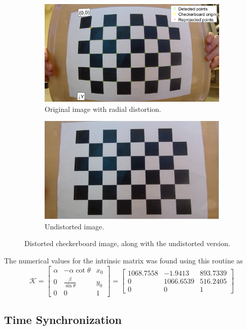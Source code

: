 \begin{figure}[H]
	\centering
	\begin{subfigure}{.5\textwidth}
		\centering
		\includegraphics[width=.8\linewidth]{fig/calibration_distorted.PNG}
		\caption{Original image with radial distortion.}
		\label{fig:sub_distort1}
	\end{subfigure}%
	\begin{subfigure}{.5\textwidth}
		\centering
		\includegraphics[width=.8\linewidth]{fig/calibration_undistorted.PNG}
		\caption{Undistorted image.}
		\label{fig:sub_distort2}
	\end{subfigure}
	\caption{Distorted checkerboard image, along with the undistorted version.}
	\label{fig:distortion}
\end{figure}
The numerical values for the intrinsic matrix was found using this routine as
\begin{equation}
\mathcal{K}=\begin{bmatrix}\alpha & -\alpha\cot{\theta} & x_0\\0 & \frac{\beta}{\sin{\theta}} & y_0\\0 & 0 & 1\end{bmatrix}=\begin{bmatrix}
1068.7558 & -1.9413 & 893.7339 \\ 0 & 1066.6539 &516.2405\\ 0 & 0 & 1
\end{bmatrix}
\end{equation}  
\subsection{Time Synchronization}
\cleardoublepage
